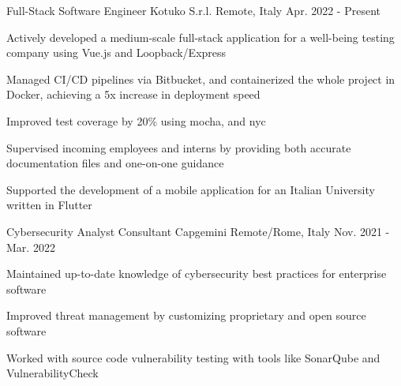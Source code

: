 

\begin{cventries}

	\cventry
	{Full-Stack Software Engineer} %
	{Kotuko S.r.l.} %
	{Remote, Italy} %
	{Apr. 2022 - Present} %
	{
		\begin{cvitems} %
			\item {Actively developed a medium-scale full-stack application for a well-being testing company using Vue.js and Loopback/Express}
			\item {Managed CI/CD pipelines via Bitbucket, and containerized the whole project in Docker, achieving a 5x increase in deployment speed}
			\item {Improved test coverage by 20\% using mocha, and nyc}
			\item {Supervised incoming employees and interns by providing both accurate documentation files and one-on-one guidance}
			\item {Supported the development of a mobile application for an Italian University written in Flutter}
		\end{cvitems}
	}

	\cventry
	{Cybersecurity Analyst Consultant} %
	{Capgemini} %
	{Remote/Rome, Italy} %
	{Nov. 2021 - Mar. 2022} %
	{
		\begin{cvitems} %
			\item {Maintained up-to-date knowledge of cybersecurity best practices for enterprise software}
			\item {Improved threat management by customizing proprietary and open source software}
			\item {Worked with source code vulnerability testing with tools like SonarQube and VulnerabilityCheck}
		\end{cvitems}
	}
\end{cventries}
